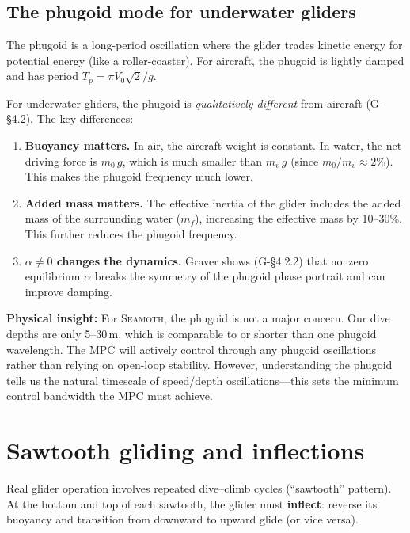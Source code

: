 \documentclass[11pt,a4paper]{article}
\newcommand{\seamoth}{\textsc{Seamoth}}
\newcommand{\insight}[1]{\par\smallskip\noindent\colorbox{green!8}{\parbox{\dimexpr\linewidth-2\fboxsep}{%
  \small\textbf{Physical insight:} #1}}\smallskip}
\begin{document}
\subsection{The phugoid mode for underwater gliders}
\label{sec:phugoid}

The phugoid is a long-period oscillation where the glider trades kinetic energy for
potential energy (like a roller-coaster).  For aircraft, the phugoid is lightly damped
and has period $T_p = \pi V_0\sqrt{2}/g$.

For underwater gliders, the phugoid is \emph{qualitatively different} from aircraft
(G-\S4.2).  The key differences:

\begin{enumerate}[nosep]
  \item \textbf{Buoyancy matters.}  In air, the aircraft weight is constant.  In water,
    the net driving force is $m_0\,g$, which is much smaller than $m_v\,g$ (since
    $m_0/m_v \approx 2\%$).  This makes the phugoid frequency much lower.
  \item \textbf{Added mass matters.}  The effective inertia of the glider includes
    the added mass of the surrounding water ($m_f$), increasing the effective mass
    by 10--30\%.  This further reduces the phugoid frequency.
  \item \textbf{$\alpha\neq0$ changes the dynamics.}  Graver shows (G-\S4.2.2) that
    nonzero equilibrium $\alpha$ breaks the symmetry of the phugoid phase portrait
    and can improve damping.
\end{enumerate}

\insight{For \seamoth{}, the phugoid is not a major concern.  Our dive depths are
only 5--30\,m, which is comparable to or shorter than one phugoid wavelength.  The
MPC will actively control through any phugoid oscillations rather than relying on
open-loop stability.  However, understanding the phugoid tells us the natural
timescale of speed/depth oscillations---this sets the minimum control bandwidth
the MPC must achieve.}


\section{Sawtooth gliding and inflections}
\label{sec:sawtooth}

Real glider operation involves repeated dive--climb cycles (``sawtooth'' pattern).
At the bottom and top of each sawtooth, the glider must \textbf{inflect}: reverse
its buoyancy and transition from downward to upward glide (or vice versa).
\end{document}

